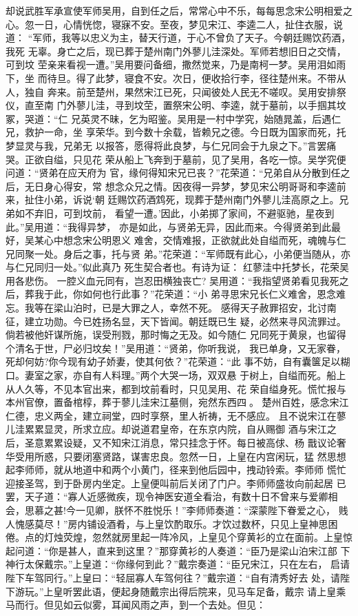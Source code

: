却说武胜军承宣使军师吴用，自到任之后，常常心中不乐，每每思念宋公明相爱之
心。忽一日，心情恍惚，寝寐不安。至夜，梦见宋江、李逵二人，扯住衣服，说道：
“军师，我等以忠义为主，替天行道，于心不曾负了天子。今朝廷赐饮药酒，我死
无辜。身亡之后，现已葬于楚州南门外蓼儿洼深处。军师若想旧日之交情，可到坟
茔亲来看视一遭。”吴用要问备细，撒然觉来，乃是南柯一梦。吴用泪如雨下，坐
而待旦。得了此梦，寝食不安。次日，便收拾行李，径往楚州来。不带从人，独自
奔来。前至楚州，果然宋江已死，只闻彼处人民无不嗟叹。吴用安排祭仪，直至南
门外蓼儿洼，寻到坟茔，置祭宋公明、李逵，就于墓前，以手掴其坟冢，哭道：“仁
兄英灵不昧，乞为昭鉴。吴用是一村中学究，始随晁盖，后遇仁兄，救护一命，坐
享荣华。到今数十余载，皆赖兄之德。今日既为国家而死，托梦显灵与我，兄弟无
以报答，愿得将此良梦，与仁兄同会于九泉之下。”言罢痛哭。正欲自缢，只见花
荣从船上飞奔到于墓前，见了吴用，各吃一惊。吴学究便问道：“贤弟在应天府为
官，缘何得知宋兄已丧？”花荣道：“兄弟自从分散到任之后，无日身心得安，常
想念众兄之情。因夜得一异梦，梦见宋公明哥哥和李逵前来，扯住小弟，诉说‘朝
廷赐饮药酒鸩死，现葬于楚州南门外蓼儿洼高原之上。兄弟如不弃旧，可到坟前，
看望一遭。’因此，小弟掷了家间，不避驱驰，星夜到此。”吴用道：“我得异梦，
亦是如此，与贤弟无异，因此而来。今得贤弟到此最好，吴某心中想念宋公明恩义
难舍，交情难报，正欲就此处自缢而死，魂魄与仁兄同聚一处。身后之事，托与贤
弟。”花荣道：“军师既有此心，小弟便当随从，亦与仁兄同归一处。”似此真乃
死生契合者也。有诗为证：
红蓼洼中托梦长，花荣吴用各悲伤。
一腔义血元同有，岂忍田横独丧亡?
吴用道：“我指望贤弟看见我死之后，葬我于此，你如何也行此事？”花荣道：“小
弟寻思宋兄长仁义难舍，恩念难忘。我等在梁山泊时，已是大罪之人，幸然不死。
感得天子赦罪招安，北讨南征，建立功勋。今已姓扬名显，天下皆闻。朝廷既已生
疑，必然来寻风流罪过。倘若被他奸谋所施，误受刑戮，那时悔之无及。如今随仁
兄同死于黄泉，也留得个清名于世，尸必归坟矣！”吴用道：“贤弟，你听我说，
我已单身，又无家眷，死却何妨?你今现有幼子娇妻，使其何依？”花荣道：“此
事不妨，自有囊箧足以糊口。妻室之家，亦自有人料理。”两个大哭一场，双双悬
于树上，自缢而死。船上从人久等，不见本官出来，都到坟前看时，只见吴用、花
荣自缢身死。慌忙报与本州官僚，置备棺椁，葬于蓼儿洼宋江墓侧，宛然东西四。
楚州百姓，感念宋江仁德，忠义两全，建立祠堂，四时享祭，里人祈祷，无不感应。
且不说宋江在蓼儿洼累累显灵，所求立应。却说道君皇帝，在东京内院，自从赐御
酒与宋江之后，圣意累累设疑，又不知宋江消息，常只挂念于怀。每日被高俅、杨
戬议论奢华受用所惑，只要闭塞贤路，谋害忠良。忽然一日，上皇在内宫闲玩，猛
然思想起李师师，就从地道中和两个小黄门，径来到他后园中，拽动铃索。李师师
慌忙迎接圣驾，到于卧房内坐定。上皇便叫前后关闭了门户。李师师盛妆向前起居
已罢，天子道：“寡人近感微疾，现令神医安道全看治，有数十日不曾来与爱卿相
会，思慕之甚!今一见卿，朕怀不胜悦乐！”李师师奏道：“深蒙陛下眷爱之心，
贱人愧感莫尽！”房内铺设酒肴，与上皇饮酌取乐。才饮过数杯，只见上皇神思困
倦。点的灯烛荧煌，忽然就房里起一阵冷风，上皇见个穿黄衫的立在面前。上皇惊
起问道：“你是甚人，直来到这里？”那穿黄衫的人奏道：“臣乃是梁山泊宋江部
下神行太保戴宗。”上皇道：“你缘何到此？”戴宗奏道：“臣兄宋江，只在左右，
启请陛下车驾同行。”上皇曰：“轻屈寡人车驾何往？”戴宗道：“自有清秀好去
处，请陛下游玩。”上皇听罢此语，便起身随戴宗出得后院来，见马车足备，戴宗
请上皇乘马而行。但见如云似雾，耳闻风雨之声，到一个去处。但见：

